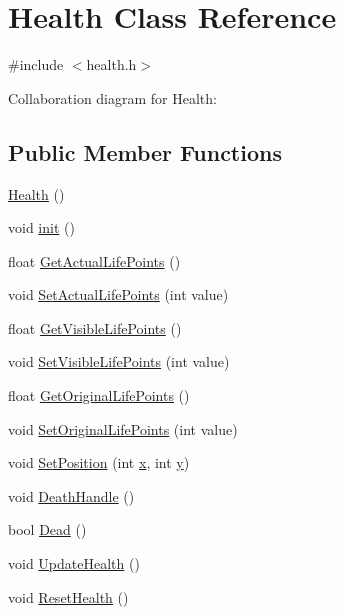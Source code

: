 \hypertarget{classHealth}{}\section{Health Class Reference}
\label{classHealth}


{\ttfamily \#include $<$health.\+h$>$}



Collaboration diagram for Health\+:
\subsection*{Public Member Functions}
\begin{DoxyCompactItemize}
\item 
\hyperlink{classHealth_acd41f307cc9a942c3335480420c0ace7}{Health} ()
\item 
void \hyperlink{classHealth_a33873878b816ca504c1bda9674507666}{init} ()
\item 
float \hyperlink{classHealth_a6abce3e8a6eb4bd125c1a5da3afa791a}{Get\+Actual\+Life\+Points} ()
\item 
void \hyperlink{classHealth_abca68d47c02b173013543c46b794bca7}{Set\+Actual\+Life\+Points} (int value)
\item 
float \hyperlink{classHealth_a2908f8df72650410471d0eb579361d5b}{Get\+Visible\+Life\+Points} ()
\item 
void \hyperlink{classHealth_acc38e31a9899242c374c99ef241872a4}{Set\+Visible\+Life\+Points} (int value)
\item 
float \hyperlink{classHealth_a287e046c38875fc1db172318cb1ec291}{Get\+Original\+Life\+Points} ()
\item 
void \hyperlink{classHealth_a6e4c354b8b1147591345550769b22f5c}{Set\+Original\+Life\+Points} (int value)
\item 
void \hyperlink{classHealth_a87f171e985a079732b9f597bb875d351}{Set\+Position} (int \hyperlink{classHealth_aceaf91c7887b0e3f9d94d91909c3b231}{x}, int \hyperlink{classHealth_addeb1f5a9d1929e16770074e17f8f1f2}{y})
\item 
void \hyperlink{classHealth_a6a842c5b9cc3f68ffe17659ee9153cf2}{Death\+Handle} ()
\item 
bool \hyperlink{classHealth_aeb35a7ebd799762bbd63b2c11c7d703e}{Dead} ()
\item 
void \hyperlink{classHealth_a364947262ddd1a1a318b470468742b08}{Update\+Health} ()
\item 
void \hyperlink{classHealth_a1e7a4804607edece9a4711a0da254f75}{Reset\+Health} ()

\end{DoxyCompactItemize}
